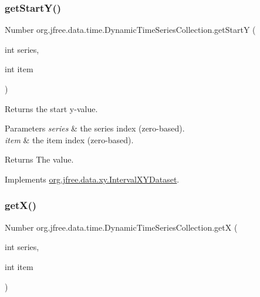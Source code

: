 \mbox{\label{classorg_1_1jfree_1_1data_1_1time_1_1_dynamic_time_series_collection_a9fb776918a455a76c7d03b80cc75703b}} 
\subsubsection{\texorpdfstring{get\+Start\+Y()}{getStartY()}}
{\footnotesize\ttfamily Number org.\+jfree.\+data.\+time.\+Dynamic\+Time\+Series\+Collection.\+get\+StartY (\begin{DoxyParamCaption}\item[{int}]{series,  }\item[{int}]{item }\end{DoxyParamCaption})}

Returns the start y-\/value.


\begin{DoxyParams}{Parameters}
{\em series} & the series index (zero-\/based). \\
\hline
{\em item} & the item index (zero-\/based).\\
\hline
\end{DoxyParams}
\begin{DoxyReturn}{Returns}
The value. 
\end{DoxyReturn}


Implements \mbox{\hyperlink{interfaceorg_1_1jfree_1_1data_1_1xy_1_1_interval_x_y_dataset_afdd414735adb233734bc35b76a005ed9}{org.\+jfree.\+data.\+xy.\+Interval\+X\+Y\+Dataset}}.

\mbox{\label{classorg_1_1jfree_1_1data_1_1time_1_1_dynamic_time_series_collection_a8f658c59c2fa6d670e529c5e484a585e}} 
\subsubsection{\texorpdfstring{get\+X()}{getX()}}
{\footnotesize\ttfamily Number org.\+jfree.\+data.\+time.\+Dynamic\+Time\+Series\+Collection.\+getX (\begin{DoxyParamCaption}\item[{int}]{series,  }\item[{int}]{item }\end{DoxyParamCaption})}

